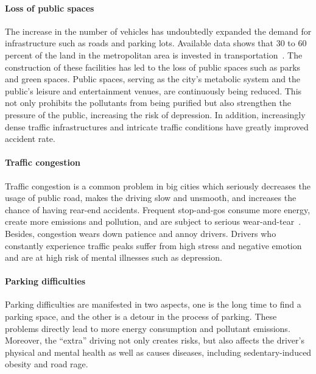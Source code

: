 \documentclass[letterpaper, twocolumn, 10pt, conference]{IEEEtran}
\begin{document}
\paragraph{Loss of public spaces}

The increase in the number of vehicles has undoubtedly expanded the demand for infrastructure such as roads and parking lots. Available data shows that 30 to 60 percent of the land in the metropolitan area is invested in transportation~\cite{rodrigue2017geography}. The construction of these facilities has led to the loss of public spaces such as parks and green spaces. Public spaces, serving as the city's metabolic system and the public’s leisure and entertainment venues, are continuously being reduced. This not only prohibits the pollutants from being purified but also strengthen the pressure of the public, increasing the risk of depression. In addition, increasingly dense traffic infrastructures and intricate traffic conditions have greatly improved accident rate.


        
\paragraph{Traffic congestion}

Traffic congestion is a common problem in big cities which seriously decreases the usage of public road, makes the driving slow and unsmooth, and increases the chance of having rear-end accidents. Frequent stop-and-gos consume more energy, create more emissions and pollution, and are subject to serious wear-and-tear~\cite{horn2013suppressing}.
Besides, congestion wears down patience and annoy drivers. Drivers who constantly experience traffic peaks suffer from high stress and negative emotion and are at high risk of mental illnesses such as depression.

\paragraph{Parking difficulties}

Parking difficulties are manifested in two aspects, one is the long time to find a parking space, and the other is a detour in the process of parking. These problems directly lead to more energy consumption and pollutant emissions. Moreover, the \enquote{extra} driving not only creates risks, but also affects the driver's physical and mental health as well as causes diseases, including sedentary-induced obesity and road rage.
\end{document}
